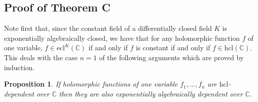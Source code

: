 \documentclass[12pt]{amsart}
\theoremstyle{definition}
\theoremstyle{plain}
\newtheorem{Prop}[defn]{Proposition}
\theoremstyle{exampstyle}\newtheorem{thmx}{Theorem}
\theoremstyle{exampstyle}\newtheorem{thmxbis}{Theorem}
\begin{document}
%
%



\subsection{Proof of Theorem C} Note first that, since the constant field of a differentially closed field $K$ is exponentially algebraically closed, we have that for any holomorphic function $f$ of one variable, $f \in \mathrm{ecl}^{K}(\mathbb{C})$ if and only if $f$ is constant if and only if $f \in \mathrm{hcl}(\mathbb{C})$. This deals with the case $n = 1$ of the following arguments which are proved by induction.

\begin{Prop}\label{o-minimal direction1}
If holomorphic functions of one variable  $f_1,\ldots,f_{n}$ are $\mathrm{hcl}$-dependent over $\mathbb{C}$ then  they are also  exponentially algebraically dependent over $\mathbb{C}$.
\end{Prop} 
\end{document}
